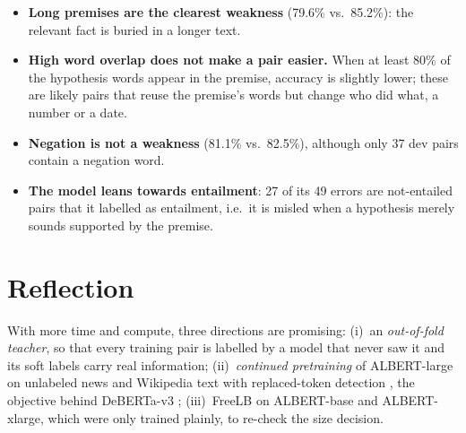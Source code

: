 \documentclass[11pt]{article}
\begin{document}
\begin{itemize}
  \item \textbf{Long premises are the clearest weakness} (79.6\% vs.\ 85.2\%): the relevant fact is buried in a longer text.
  \item \textbf{High word overlap does not make a pair easier.} When at least 80\% of the hypothesis words appear in
        the premise, accuracy is slightly lower; these are likely pairs that reuse the premise's words but change
        who did what, a number or a date.
  \item \textbf{Negation is not a weakness} (81.1\% vs.\ 82.5\%), although only 37 dev pairs contain a negation word.
  \item \textbf{The model leans towards entailment}: 27 of its 49 errors are not-entailed pairs that it labelled as
        entailment, i.e.\ it is misled when a hypothesis merely sounds supported by the premise.
\end{itemize}

\section{Reflection}

With more time and compute, three directions are promising: (i)~an \emph{out-of-fold teacher}, so that every training pair is labelled
by a model that never saw it and its soft labels carry real information; (ii)~\emph{continued pretraining} of ALBERT-large on unlabeled news and
Wikipedia text with replaced-token detection \cite{clark2020electra}, the objective behind DeBERTa-v3
\cite{he2023debertav3}; (iii)~FreeLB on ALBERT-base and ALBERT-xlarge, which were only trained plainly, to re-check the size decision.
\end{document}
